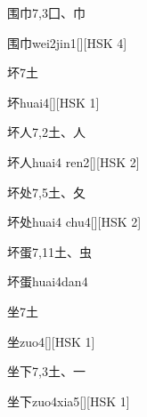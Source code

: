 \begin{entry}{围巾}{7,3}{⼞、⼱}
  \begin{phonetics}{围巾}{wei2jin1}[][HSK 4]
  \end{phonetics}
\end{entry}

\begin{entry}{坏}{7}{⼟}
  \begin{phonetics}{坏}{huai4}[][HSK 1]
  \end{phonetics}
\end{entry}

\begin{entry}{坏人}{7,2}{⼟、⼈}
  \begin{phonetics}{坏人}{huai4 ren2}[][HSK 2]
  \end{phonetics}
\end{entry}

\begin{entry}{坏处}{7,5}{⼟、⼡}
  \begin{phonetics}{坏处}{huai4 chu4}[][HSK 2]
  \end{phonetics}
\end{entry}

\begin{entry}{坏蛋}{7,11}{⼟、⾍}
  \begin{phonetics}{坏蛋}{huai4dan4}
  \end{phonetics}
\end{entry}

\begin{entry}{坐}{7}{⼟}
  \begin{phonetics}{坐}{zuo4}[][HSK 1]
  \end{phonetics}
\end{entry}

\begin{entry}{坐下}{7,3}{⼟、⼀}
  \begin{phonetics}{坐下}{zuo4xia5}[][HSK 1]
  \end{phonetics}
\end{entry}

